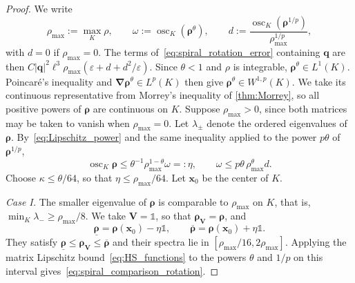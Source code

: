\documentclass[final,reqno]{amsart}
\theoremstyle{remark}
\renewcommand{\le}{\leqslant}
\renewcommand{\ge}{\geqslant}
\renewcommand{\epsilon}{\varepsilon}
\newcommand{\ol}[1]{\overline{#1}}
\newcommand{\ul}[1]{\underline{#1}}
\newcommand{\iden}{\mathbb{1}}
\newcommand{\grad}{\bm{\nabla}}
\begin{document}
\begin{proof}
We write
$$
\rho_{\max}:=\max_K\rho,\qquad\omega:=\operatorname{osc}_K(\bm{\rho}^\theta),\qquad d:=\frac{\operatorname{osc}_K(\bm{\rho}^{1/p})}{\rho_{\max}^{1/p}},
$$
with $d=0$ if $\rho_{\max}=0$. The terms of~\cref{eq:spiral_rotation_error} containing $\mathbf{q}$ are then $C|\mathbf{q}|^2\ell^3\rho_{\max}(\epsilon+d+d^2/\epsilon)$. Since $\theta<1$ and $\rho$ is integrable, $\bm{\rho}^\theta\in L^1(K)$. Poincar\'e's inequality and $\grad\bm{\rho}^\theta\in L^p(K)$ then give $\bm{\rho}^\theta\in W^{1,p}(K)$. We take its continuous representative from Morrey's inequality of \cref{thm:Morrey}, so all positive powers of $\bm{\rho}$ are continuous on $K$. Suppose $\rho_{\max}>0$, since both matrices may be taken to vanish when $\rho_{\max}=0$. Let $\lambda_\pm$ denote the ordered eigenvalues of $\bm{\rho}$. By~\cref{eq:Lipschitz_power} and the same inequality applied to the power $p\theta$ of $\bm{\rho}^{1/p}$,
\[
 \operatorname{osc}_K\bm{\rho}\le \theta^{-1}\rho_{\max}^{1-\theta}\omega=:\eta,\qquad
 \omega\le p\theta\,\rho_{\max}^\theta d .
\]
Choose $\kappa\le\theta/64$, so that $\eta\le \rho_{\max}/64$. Let $\mathbf{x}_0$ be the center of $K$.

\noindent\emph{Case I.} The smaller eigenvalue of $\bm{\rho}$ is comparable to $\rho_{\max}$ on $K$, that is, $\min_K\lambda_-\ge \rho_{\max}/8$. We take $\mathbf{V}=\iden$, so that $\bm{\rho}_{\mathbf{V}}=\bm{\rho}$, and
\[
 \ul{\bm{\rho}}=\bm{\rho}(\mathbf{x}_0)-\eta\iden,\qquad
 \ol{\bm{\rho}}=\bm{\rho}(\mathbf{x}_0)+\eta\iden .
\]
They satisfy $\ul{\bm{\rho}}\le\bm{\rho}_{\mathbf{V}}\le\ol{\bm{\rho}}$ and their spectra lie in $[\rho_{\max}/16,2\rho_{\max}]$. Applying the matrix Lipschitz bound~\cref{eq:HS_functions} to the powers $\theta$ and $1/p$ on this interval gives~\cref{eq:spiral_comparison_rotation}.


\end{proof}
\end{document}
